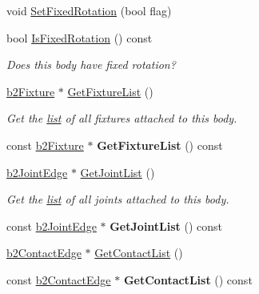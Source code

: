 \begin{DoxyCompactItemize}
void \hyperlink{classb2Body_aff35078e2a221d2d05409674936cb8d2}{Set\+Fixed\+Rotation} (bool flag)
\item 
\mbox{\label{classb2Body_a0920b7a770f7c876cf6d149e227036b5}} 
bool \hyperlink{classb2Body_a0920b7a770f7c876cf6d149e227036b5}{Is\+Fixed\+Rotation} () const
\begin{DoxyCompactList}\small\item\em Does this body have fixed rotation? \end{DoxyCompactList}\item 
\mbox{\label{classb2Body_a64634da20c6e0ab2d68a3cc9ea15efc3}} 
\hyperlink{classb2Fixture}{b2\+Fixture} $\ast$ \hyperlink{classb2Body_a64634da20c6e0ab2d68a3cc9ea15efc3}{Get\+Fixture\+List} ()
\begin{DoxyCompactList}\small\item\em Get the \hyperlink{protocollist-p}{list} of all fixtures attached to this body. \end{DoxyCompactList}\item 
\mbox{\label{classb2Body_ae232293cb940477443434c5e846607e3}} 
const \hyperlink{classb2Fixture}{b2\+Fixture} $\ast$ {\bfseries Get\+Fixture\+List} () const
\item 
\mbox{\label{classb2Body_a55cf2eb851780599ca5c1f6f25a17e41}} 
\hyperlink{structb2JointEdge}{b2\+Joint\+Edge} $\ast$ \hyperlink{classb2Body_a55cf2eb851780599ca5c1f6f25a17e41}{Get\+Joint\+List} ()
\begin{DoxyCompactList}\small\item\em Get the \hyperlink{protocollist-p}{list} of all joints attached to this body. \end{DoxyCompactList}\item 
\mbox{\label{classb2Body_a3e581c94ae0fbc4e1083bf6ed8c0f0a9}} 
const \hyperlink{structb2JointEdge}{b2\+Joint\+Edge} $\ast$ {\bfseries Get\+Joint\+List} () const
\item 
\hyperlink{structb2ContactEdge}{b2\+Contact\+Edge} $\ast$ \hyperlink{classb2Body_a16bdbfb266c82a0ef51be351a8928bc5}{Get\+Contact\+List} ()
\item 
\mbox{\label{classb2Body_a137168690469fb838ab89c5f27a7cf43}} 
const \hyperlink{structb2ContactEdge}{b2\+Contact\+Edge} $\ast$ {\bfseries Get\+Contact\+List} () const

\end{DoxyCompactItemize}
